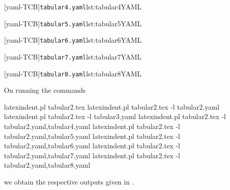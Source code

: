 	\begin{minipage}{.45\textwidth}
		[yaml-TCB]{\texttt{tabular4.yaml}}{lst:tabular4YAML}
	\end{minipage}%
	\hfill
	\begin{minipage}{.48\textwidth}
		[yaml-TCB]{\texttt{tabular5.yaml}}{lst:tabular5YAML}
	\end{minipage}%

	\begin{minipage}{.45\textwidth}
		[yaml-TCB]{\texttt{tabular6.yaml}}{lst:tabular6YAML}
	\end{minipage}%
	\hfill
	\begin{minipage}{.48\textwidth}
		[yaml-TCB]{\texttt{tabular7.yaml}}{lst:tabular7YAML}
	\end{minipage}%

	\begin{minipage}{.48\textwidth}
		[yaml-TCB]{\texttt{tabular8.yaml}}{lst:tabular8YAML}
	\end{minipage}%

	On running the commands
	\begin{commandshell}
latexindent.pl tabular2.tex 
latexindent.pl tabular2.tex -l tabular2.yaml
latexindent.pl tabular2.tex -l tabular3.yaml
latexindent.pl tabular2.tex -l tabular2.yaml,tabular4.yaml
latexindent.pl tabular2.tex -l tabular2.yaml,tabular5.yaml
latexindent.pl tabular2.tex -l tabular2.yaml,tabular6.yaml
latexindent.pl tabular2.tex -l tabular2.yaml,tabular7.yaml
latexindent.pl tabular2.tex -l tabular2.yaml,tabular8.yaml
\end{commandshell}
	we obtain the respective outputs given in
	.

